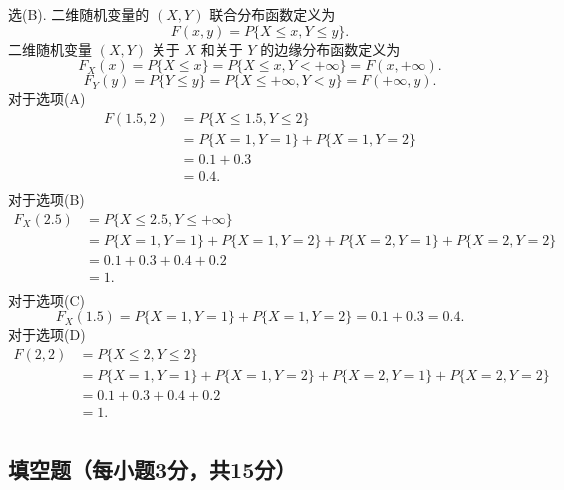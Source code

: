 \begin{solution}
    选(B).  二维随机变量的 $(X,Y)$ 联合分布函数定义为
    $$
        F(x,y) = P\{X \leqslant x, Y \leqslant y\}.
    $$
    二维随机变量 $(X,Y)$ 关于 $X$ 和关于 $Y$ 的边缘分布函数定义为
    $$
        F_X(x) = P\{X \leqslant x\}
        = P\{X \leqslant x, Y < +\infty\}
        = F(x, +\infty).
    $$
    $$
        F_Y(y) = P\{Y \leqslant y\}
        = P\{X \leqslant +\infty, Y < y\}
        = F(+\infty, y).
    $$
    对于选项(A)
    $$
        \begin{aligned}
            F(1.5, 2)
             & = P\{X \leqslant 1.5, Y \leqslant 2\} \\
             & = P\{X=1, Y=1\} + P\{X=1, Y=2\}       \\
             & = 0.1 + 0.3                           \\
             & = 0.4.                                \\
        \end{aligned}
    $$
    对于选项(B)
    $$
        \begin{aligned}
            F_X(2.5)
             & = P\{X \leqslant 2.5, Y \leqslant +\infty\}                     \\
             & = P\{X=1, Y=1\} + P\{X=1, Y=2\} + P\{X=2, Y=1\} + P\{X=2, Y=2\} \\
             & = 0.1+0.3+0.4+0.2                                               \\
             & = 1.                                                            \\
        \end{aligned}
    $$
    对于选项(C)
    $$
        F_X(1.5) = P\{X=1, Y=1\} + P\{X=1, Y=2\} = 0.1 + 0.3 = 0.4.
    $$
    对于选项(D)
    $$
        \begin{aligned}
            F(2,2)
             & = P\{X \leqslant 2, Y \leqslant 2\}                             \\
             & = P\{X=1, Y=1\} + P\{X=1, Y=2\} + P\{X=2, Y=1\} + P\{X=2, Y=2\} \\
             & = 0.1+0.3+0.4+0.2                                               \\
             & = 1.                                                            \\
        \end{aligned}
    $$
\end{solution}


\subsection{填空题（每小题3分，共15分）}

